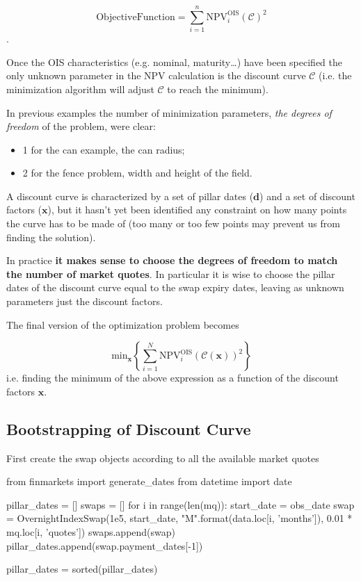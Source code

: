 \begin{equation}
\mathrm{Objective Function} = \sum_{i=1}^{n}\mathrm{NPV}^\mathrm{OIS}_i(\mathcal{C})^2
\end{equation}.

Once the OIS characteristics (e.g. nominal, maturity\ldots) have been specified the only unknown parameter in the NPV calculation is the discount curve $\mathcal{C}$ (i.e. the minimization algorithm will adjust $\mathcal{C}$ to reach the minimum).

In previous examples the number of minimization parameters, \emph{the degrees of freedom} of the problem, were clear:
\begin{itemize}
\item 1 for the can example, the can radius;
\item 2 for the fence problem, width and height of the field.
\end{itemize}

A discount curve is characterized by a set of pillar dates ($\mathbf{d}$) and a set of discount factors ($\mathbf{x}$), but it hasn't yet been identified any constraint on how many points the curve has to be made of (too many or too few points may prevent us from finding the solution).

In practice \textbf{it makes sense to choose the degrees of freedom to match the number of market quotes}. In particular it is wise to choose the pillar dates of the discount curve equal to the swap expiry dates, leaving as unknown parameters just the discount factors.

The final version of the optimization problem becomes

\begin{equation}
 \mathrm{min}_{\mathbf{x}} \left\{\sum_{i=1}^{N}\mathrm{NPV}^\mathrm{OIS}_i( \mathcal{C}(\mathbf{x}))^2\right\}
\end{equation}
i.e. finding the minimum of the above expression as a function of the discount factors $\mathbf{x}$.

\subsection{Bootstrapping of Discount Curve}
First create the swap objects according to all the available market quotes

\begin{ipython}
from finmarkets import generate_dates
from datetime import date

pillar_dates = []
swaps = []
for i in range(len(mq)):
    start_date = obs_date
    swap = OvernightIndexSwap(1e5,
                              start_date,
                              "{}M".format(data.loc[i, 'months']),
                              0.01 * mq.loc[i, 'quotes'])
    swaps.append(swap)
    pillar_dates.append(swap.payment_dates[-1])

pillar_dates = sorted(pillar_dates)
\end{ipython}

